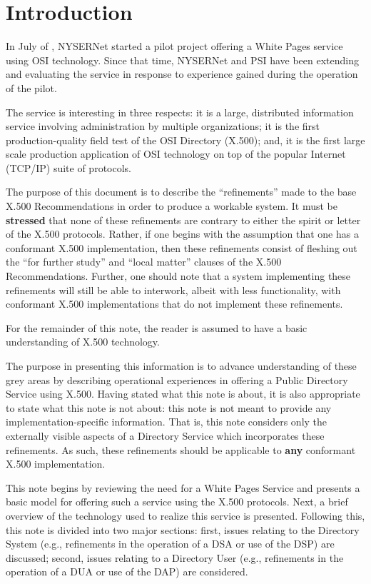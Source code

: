 
\newpage
\section	{Introduction}
In July of {},
NYSERNet started a pilot project offering a White Pages service using OSI
technology.
Since that time,
NYSERNet and PSI have been extending and evaluating the service in response to
experience gained during the operation of the pilot.

The service is interesting in three respects:
it is a large,
distributed information service involving administration by multiple
organizations;
it is the first production-quality field test of the OSI Directory (X.500);
and,
it is the first large scale production application of OSI technology on top of
the popular Internet (TCP/IP) suite of protocols.

The purpose of this document is to describe the ``refinements'' made to the
base X.500 Recommendations in order to produce a workable system.
It must be {\bf stressed\/} that none of these refinements are contrary to
either the spirit or letter of the X.500 protocols.
Rather,
if one begins with the assumption that one has a conformant X.500
implementation,
then these refinements consist of fleshing out the ``for further study'' and
``local matter'' clauses of the X.500 Recommendations.
Further,
one should note that a system implementing these refinements will still be
able to interwork,
albeit with less functionality,
with conformant X.500 implementations that do not implement these refinements.

For the remainder of this note,
the reader is assumed to have a basic understanding of X.500 technology.

The purpose in presenting this information is to advance understanding of
these grey areas by describing operational experiences in offering a Public
Directory Service using X.500.
Having stated what this note is about,
it is also appropriate to state what this note is not about:
this note is not meant to provide any implementation-specific information.
That is,
this note considers only the externally visible aspects of a Directory Service
which incorporates these refinements.
As such,
these refinements should be applicable to {\bf any\/} conformant X.500
implementation.

This note begins by reviewing the need for a White Pages Service and presents
a basic model for offering such a service using the X.500 protocols.
Next,
a brief overview of the technology used to realize this service is presented.
Following this,
this note is divided into two major sections:
first,
issues relating to the Directory System
(e.g., refinements in the operation of a DSA or use of the DSP)
are discussed;
second,
issues relating to a Directory User
(e.g., refinements in the operation of a DUA or use of the DAP)
are considered.

